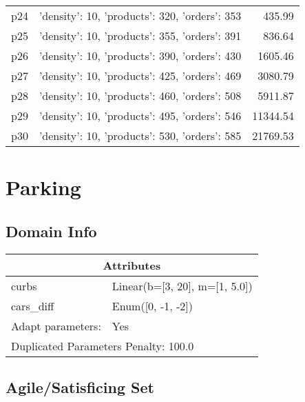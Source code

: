 \documentclass{article}
\begin{document}
\begin{center}
\begin{tabular}{@{}l|r|r@{}}
  p24&{'density': 10, 'products': 320, 'orders': 353}&435.99\\
  p25&{'density': 10, 'products': 355, 'orders': 391}&836.64\\
  p26&{'density': 10, 'products': 390, 'orders': 430}&1605.46\\
  p27&{'density': 10, 'products': 425, 'orders': 469}&3080.79\\
  p28&{'density': 10, 'products': 460, 'orders': 508}&5911.87\\
  p29&{'density': 10, 'products': 495, 'orders': 546}&11344.54\\
  p30&{'density': 10, 'products': 530, 'orders': 585}&21769.53
                            \end{tabular}
                            \end{center}
                    
                            \newpage \section{Parking}
                    \subsection*{Domain Info}

                    \begin{center}
                    \begin{tabular}{@{}p{}p{}@{}}
                    \multicolumn{2}{c}{\bf \large Attributes}\\\midrule
                    curbs & Linear(b=[3, 20], m=[1, 5.0])\\
cars\_diff & Enum([0, -1, -2])
                    
                    \\\midrule
                    Adapt parameters: & Yes
                
                     \\\midrule
                    \multicolumn{2}{l}{Duplicated Parameters Penalty: 100.0}
                    \end{tabular}
                    \end{center}
                
                         \subsection*{Agile/Satisficing Set}
\end{document}
